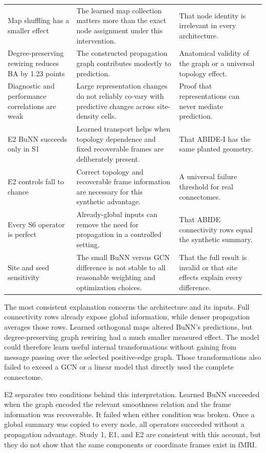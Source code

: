 \documentclass[11pt,a4paper]{article}
\begin{document}
\begin{table}[htbp]
\begin{tabularx}{\textwidth}{@{}p{3.1cm}Y Y@{}}
Map shuffling has a smaller effect & The learned map collection matters more than the exact node assignment under this intervention. & That node identity is irrelevant in every architecture. \\
Degree-preserving rewiring reduces BA by 1.23 points & The constructed propagation graph contributes modestly to prediction. & Anatomical validity of the graph or a universal topology effect. \\
Diagnostic and performance correlations are weak & Large representation changes do not reliably co-vary with predictive changes across site-density cells. & Proof that representations can never mediate prediction. \\
E2 BuNN succeeds only in S1 & Learned transport helps when topology dependence and fixed recoverable frames are deliberately present. & That ABIDE-I has the same planted geometry. \\
E2 controls fall to chance & Correct topology and recoverable frame information are necessary for this synthetic advantage. & A universal failure threshold for real connectomes. \\
Every S6 operator is perfect & Already-global inputs can remove the need for propagation in a controlled setting. & That ABIDE connectivity rows equal the synthetic summary. \\
Site and seed sensitivity & The small BuNN versus GCN difference is not stable to all reasonable weighting and optimization choices. & That the full result is invalid or that site effects explain every difference. \\
\bottomrule
\end{tabularx}
\end{table}

The most consistent explanation concerns the architecture and its inputs. Full
connectivity rows already expose global information, while denser propagation
averages those rows. Learned orthogonal maps altered BuNN's predictions, but
degree-preserving graph rewiring had a much smaller measured effect. The model
could therefore learn useful internal transformations without gaining from
message passing over the selected positive-edge graph. Those transformations
also failed to exceed a GCN or a linear model that directly used the complete
connectome.

E2 separates two conditions behind this interpretation. Learned BuNN succeeded
when the graph encoded the relevant smoothness relation and the frame
information was recoverable. It failed when either condition was broken. Once
a global summary was copied to every node, all operators succeeded without a
propagation advantage. Study 1, E1, and E2 are consistent with this account,
but they do not show that the same components or coordinate frames exist in
fMRI.
\end{document}
